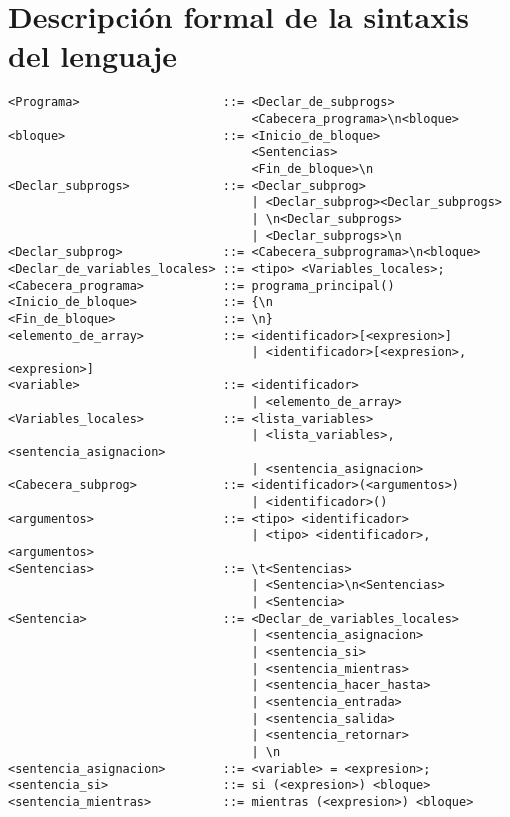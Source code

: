 \section{Descripción formal de la sintaxis del lenguaje}

\begin{verbatim}
<Programa>                    ::= <Declar_de_subprogs>
                                  <Cabecera_programa>\n<bloque>
<bloque>                      ::= <Inicio_de_bloque>
                                  <Sentencias>
                                  <Fin_de_bloque>\n
<Declar_subprogs>             ::= <Declar_subprog>
                                  | <Declar_subprog><Declar_subprogs>
                                  | \n<Declar_subprogs>
                                  | <Declar_subprogs>\n
<Declar_subprog>              ::= <Cabecera_subprograma>\n<bloque>
<Declar_de_variables_locales> ::= <tipo> <Variables_locales>;
<Cabecera_programa>           ::= programa_principal()
<Inicio_de_bloque>            ::= {\n
<Fin_de_bloque>               ::= \n}
<elemento_de_array>           ::= <identificador>[<expresion>]
                                  | <identificador>[<expresion>, <expresion>]
<variable>                    ::= <identificador>
                                  | <elemento_de_array>
<Variables_locales>           ::= <lista_variables>
                                  | <lista_variables>, <sentencia_asignacion>
                                  | <sentencia_asignacion>
<Cabecera_subprog>            ::= <identificador>(<argumentos>)
                                  | <identificador>()
<argumentos>                  ::= <tipo> <identificador>
                                  | <tipo> <identificador>, <argumentos>
<Sentencias>                  ::= \t<Sentencias>
                                  | <Sentencia>\n<Sentencias>
                                  | <Sentencia>
<Sentencia>                   ::= <Declar_de_variables_locales>
                                  | <sentencia_asignacion>
                                  | <sentencia_si>
                                  | <sentencia_mientras>
                                  | <sentencia_hacer_hasta>
                                  | <sentencia_entrada>
                                  | <sentencia_salida>
                                  | <sentencia_retornar>
                                  | \n
<sentencia_asignacion>        ::= <variable> = <expresion>;
<sentencia_si>                ::= si (<expresion>) <bloque>
<sentencia_mientras>          ::= mientras (<expresion>) <bloque>

\end{verbatim}
